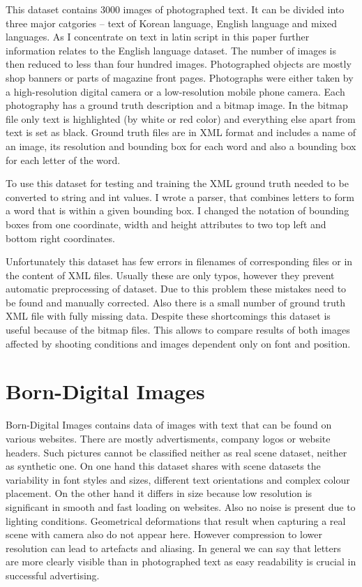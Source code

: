 This dataset contains 3000 images of photographed text. It can be divided into three major catgories -- text of Korean language, English language and mixed languages. As I concentrate on text in latin script in this paper further information relates to the English language dataset. The number of images is then reduced to less than four hundred images. Photographed objects are mostly shop banners or parts of magazine front pages. Photographs were either taken by a high-resolution digital camera or a low-resolution mobile phone camera.\cite{kaist} Each photography has a ground truth description and a bitmap image. In the bitmap file only text is highlighted (by white or red color) and everything else apart from text is set as black. Ground truth files are in XML format and includes a name of an image, its resolution and bounding box for each word and also a bounding box for each letter of the word.

To use this dataset for testing and training the XML ground truth needed to be converted to string and int values. I wrote a parser, that combines letters to form a word that is within a given bounding box. I changed the notation of bounding boxes from one coordinate, width and height attributes to two top left and bottom right coordinates.

Unfortunately this dataset has few errors in filenames of corresponding files or in the content of XML files. Usually these are only typos, however they prevent automatic preprocessing of dataset. Due to this problem these mistakes need to be found and  manually corrected. Also there is a small number of ground truth XML file with fully missing data. 
Despite these shortcomings this dataset is useful because of the bitmap files. This allows to compare results of both images affected by shooting conditions and images dependent only on font and position.

\section{Born-Digital Images}

Born-Digital Images contains data of images with text that can be found on various websites. There are mostly advertisments, company logos or website headers. Such pictures cannot be classified neither as real scene dataset, neither as synthetic one. On one hand  this dataset shares with scene datasets the variability in font styles and sizes, different text orientations and complex colour placement. On the other hand it differs in size because low resolution is significant in smooth and fast loading on websites. Also no noise is present due to lighting conditions. Geometrical deformations that result when capturing a real scene with camera also do not appear here. However compression to lower resolution can lead to artefacts and aliasing. In general we can say that letters are more clearly visible than in photographed text as easy readability is crucial in successful advertising.

